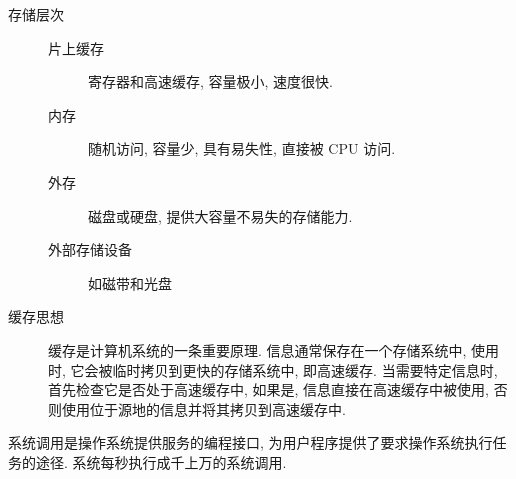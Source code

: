 \documentclass[11pt]{homework}
\begin{document}
\question
\begin{description}
    \item[存储层次] \hfill
    \begin{description}
        \item[片上缓存] 寄存器和高速缓存, 容量极小, 速度很快.
        \item[内存]  随机访问, 容量少, 具有易失性, 直接被 CPU 访问.
        \item[外存] 磁盘或硬盘, 提供大容量不易失的存储能力.
        \item[外部存储设备] 如磁带和光盘 
    \end{description} 
    \item[缓存思想] 
    缓存是计算机系统的一条重要原理. 信息通常保存在一个存储系统中, 使用时, 它会被临时拷贝到更快的存储系统中, 即高速缓存. 当需要特定信息时, 首先检查它是否处于高速缓存中, 如果是, 信息直接在高速缓存中被使用, 否则使用位于源地的信息并将其拷贝到高速缓存中.
\end{description}
\question
系统调用是操作系统提供服务的编程接口, 为用户程序提供了要求操作系统执行任务的途径. 系统每秒执行成千上万的系统调用.
\end{document}
